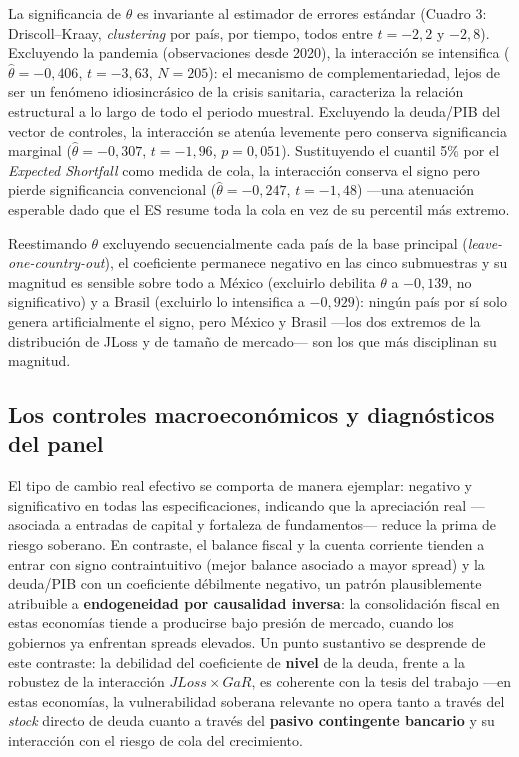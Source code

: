 \documentclass[5p,times,twocolumn,authoryear]{elsarticle}
\begin{document}
La significancia de $\theta$ es invariante al estimador de errores estándar (Cuadro 3: Driscoll–Kraay, \textit{clustering} por país, por tiempo, todos entre $t=-2{,}2$ y $-2{,}8$). Excluyendo la pandemia (observaciones desde 2020), la interacción se intensifica ($\hat\theta=-0{,}406$, $t=-3{,}63$, $N=205$): el mecanismo de complementariedad, lejos de ser un fenómeno idiosincrásico de la crisis sanitaria, caracteriza la relación estructural a lo largo de todo el periodo muestral. Excluyendo la deuda/PIB del vector de controles, la interacción se atenúa levemente pero conserva significancia marginal ($\hat\theta=-0{,}307$, $t=-1{,}96$, $p=0{,}051$). Sustituyendo el cuantil 5\% por el \textit{Expected Shortfall} como medida de cola, la interacción conserva el signo pero pierde significancia convencional ($\hat\theta=-0{,}247$, $t=-1{,}48$) —una atenuación esperable dado que el ES resume toda la cola en vez de su percentil más extremo.

Reestimando $\theta$ excluyendo secuencialmente cada país de la base principal (\textit{leave-one-country-out}), el coeficiente permanece negativo en las cinco submuestras y su magnitud es sensible sobre todo a México (excluirlo debilita $\theta$ a $-0{,}139$, no significativo) y a Brasil (excluirlo lo intensifica a $-0{,}929$): ningún país por sí solo genera artificialmente el signo, pero México y Brasil —los dos extremos de la distribución de JLoss y de tamaño de mercado— son los que más disciplinan su magnitud.

\subsection{Los controles macroeconómicos y diagnósticos del panel}

El tipo de cambio real efectivo se comporta de manera ejemplar: negativo y significativo en todas las especificaciones, indicando que la apreciación real —asociada a entradas de capital y fortaleza de fundamentos— reduce la prima de riesgo soberano. En contraste, el balance fiscal y la cuenta corriente tienden a entrar con signo contraintuitivo (mejor balance asociado a mayor spread) y la deuda/PIB con un coeficiente débilmente negativo, un patrón plausiblemente atribuible a \textbf{endogeneidad por causalidad inversa}: la consolidación fiscal en estas economías tiende a producirse bajo presión de mercado, cuando los gobiernos ya enfrentan spreads elevados. Un punto sustantivo se desprende de este contraste: la debilidad del coeficiente de \textbf{nivel} de la deuda, frente a la robustez de la interacción $JLoss\times GaR$, es coherente con la tesis del trabajo —en estas economías, la vulnerabilidad soberana relevante no opera tanto a través del \textit{stock} directo de deuda cuanto a través del \textbf{pasivo contingente bancario} y su interacción con el riesgo de cola del crecimiento.
\end{document}
